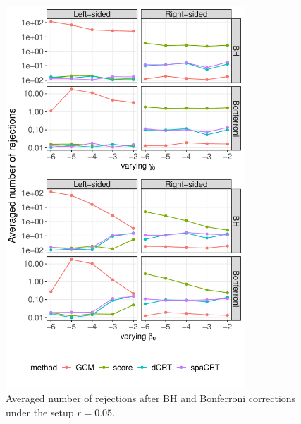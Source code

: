 \documentclass[12pt]{article}
\theoremstyle{definition}
\begin{document}
  \begin{figure}[!ht]
    \centering
    \includegraphics[width=0.8\textwidth]{figures-and-tables/simulation/NB-regression/FDR/disp-0.05-multiple_testing_rejection_plot.pdf}
    \caption{Averaged number of rejections after BH and Bonferroni corrections under the setup $r=0.05$.}
    \label{fig:simulation-CRISPR-screens-high-multiplicity-disp-0.05}
  \end{figure}
\end{document}

